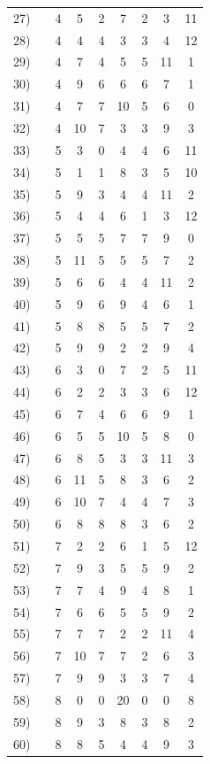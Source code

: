 \begin{longtable}{rc|ccccccc}
27) &  & 4 & 5 & 2 & 7 & 2 & 3 & 11 \\
28) &  & 4 & 4 & 4 & 3 & 3 & 4 & 12 \\
29) &  & 4 & 7 & 4 & 5 & 5 & 11 & 1 \\
30) &  & 4 & 9 & 6 & 6 & 6 & 7 & 1 \\
31) &  & 4 & 7 & 7 & 10 & 5 & 6 & 0 \\
32) &  & 4 & 10 & 7 & 3 & 3 & 9 & 3 \\
33) &  & 5 & 3 & 0 & 4 & 4 & 6 & 11 \\
34) &  & 5 & 1 & 1 & 8 & 3 & 5 & 10 \\
35) &  & 5 & 9 & 3 & 4 & 4 & 11 & 2 \\
36) &  & 5 & 4 & 4 & 6 & 1 & 3 & 12 \\
37) &  & 5 & 5 & 5 & 7 & 7 & 9 & 0 \\
38) &  & 5 & 11 & 5 & 5 & 5 & 7 & 2 \\
39) &  & 5 & 6 & 6 & 4 & 4 & 11 & 2 \\
40) &  & 5 & 9 & 6 & 9 & 4 & 6 & 1 \\
41) &  & 5 & 8 & 8 & 5 & 5 & 7 & 2 \\
42) &  & 5 & 9 & 9 & 2 & 2 & 9 & 4 \\
43) &  & 6 & 3 & 0 & 7 & 2 & 5 & 11 \\
44) &  & 6 & 2 & 2 & 3 & 3 & 6 & 12 \\
45) &  & 6 & 7 & 4 & 6 & 6 & 9 & 1 \\
46) &  & 6 & 5 & 5 & 10 & 5 & 8 & 0 \\
47) &  & 6 & 8 & 5 & 3 & 3 & 11 & 3 \\
48) &  & 6 & 11 & 5 & 8 & 3 & 6 & 2 \\
49) &  & 6 & 10 & 7 & 4 & 4 & 7 & 3 \\
50) &  & 6 & 8 & 8 & 8 & 3 & 6 & 2 \\
51) &  & 7 & 2 & 2 & 6 & 1 & 5 & 12 \\
52) &  & 7 & 9 & 3 & 5 & 5 & 9 & 2 \\
53) &  & 7 & 7 & 4 & 9 & 4 & 8 & 1 \\
54) &  & 7 & 6 & 6 & 5 & 5 & 9 & 2 \\
55) &  & 7 & 7 & 7 & 2 & 2 & 11 & 4 \\
56) &  & 7 & 10 & 7 & 7 & 2 & 6 & 3 \\
57) &  & 7 & 9 & 9 & 3 & 3 & 7 & 4 \\
58) &  & 8 & 0 & 0 & 20 & 0 & 0 & 8 \\
59) &  & 8 & 9 & 3 & 8 & 3 & 8 & 2 \\
60) &  & 8 & 8 & 5 & 4 & 4 & 9 & 3 \\

\end{longtable}
